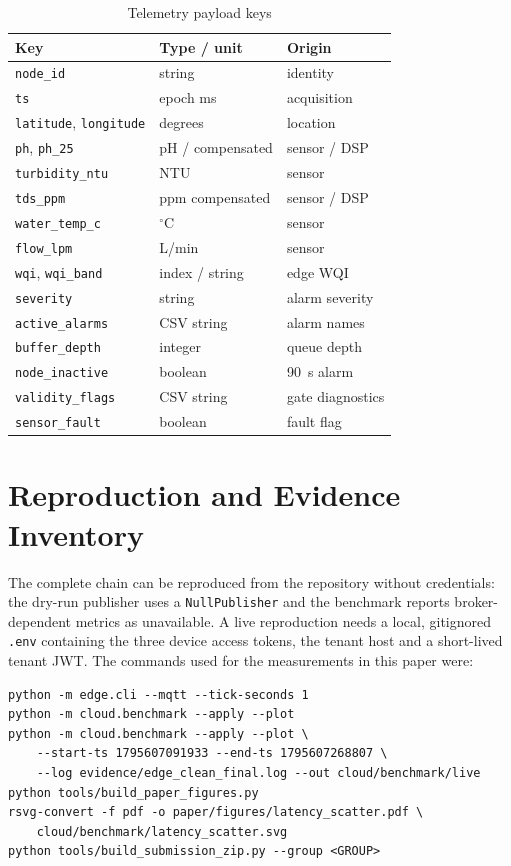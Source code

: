 \documentclass[conference]{IEEEtran}
\begin{document}
\begin{table}[t]
\caption{Telemetry payload keys}
\label{tab:payload}
\centering
\scriptsize
\begin{tabular}{@{}lll@{}}
\toprule
Key & Type / unit & Origin \\
\midrule
\texttt{node\_id} & string & identity \\
\texttt{ts} & epoch ms & acquisition \\
\texttt{latitude}, \texttt{longitude} & degrees & location \\
\texttt{ph}, \texttt{ph\_25} & pH / compensated & sensor / DSP \\
\texttt{turbidity\_ntu} & NTU & sensor \\
\texttt{tds\_ppm} & ppm compensated & sensor / DSP \\
\texttt{water\_temp\_c} & $^\circ$C & sensor \\
\texttt{flow\_lpm} & L/min & sensor \\
\texttt{wqi}, \texttt{wqi\_band} & index / string & edge WQI \\
\texttt{severity} & string & alarm severity \\
\texttt{active\_alarms} & CSV string & alarm names \\
\texttt{buffer\_depth} & integer & queue depth \\
\texttt{node\_inactive} & boolean & 90~s alarm \\
\texttt{validity\_flags} & CSV string & gate diagnostics \\
\texttt{sensor\_fault} & boolean & fault flag \\
\bottomrule
\end{tabular}
\end{table}

\section{Reproduction and Evidence Inventory}
\label{app:repro}

The complete chain can be reproduced from the repository without credentials:
the dry-run publisher uses a \texttt{NullPublisher} and the benchmark reports
broker-dependent metrics as unavailable. A live reproduction needs a local,
gitignored \texttt{.env} containing the three device access tokens, the tenant
host and a short-lived tenant JWT. The commands used for the measurements in
this paper were:

{\tiny
\begin{verbatim}
python -m edge.cli --mqtt --tick-seconds 1
python -m cloud.benchmark --apply --plot
python -m cloud.benchmark --apply --plot \
    --start-ts 1795607091933 --end-ts 1795607268807 \
    --log evidence/edge_clean_final.log --out cloud/benchmark/live
python tools/build_paper_figures.py
rsvg-convert -f pdf -o paper/figures/latency_scatter.pdf \
    cloud/benchmark/latency_scatter.svg
python tools/build_submission_zip.py --group <GROUP>
\end{verbatim}
}
\end{document}

